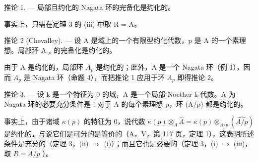 推论 1. --- 局部且约化的 Nagata 环的完备化是约化的。

事实上，只需在定理 3 的 (iii) 中取 R = A。

推论 2 (Chevalley). --- 设 A 是域上的一个有限型约化代数，p 是 A 的一个素理想。局部环 A \(_{p}\) 的完备化是约化的。

由于 A 是约化的，局部环 \(A_{p}\) 是约化的；此外，A 是一个 Nagata 环（例 1），因而 \(A_{p}\) 是 Nagata 环（命题 4），而把推论 1 应用于环 \(A_{p}\) 即得推论 2。

推论 3. --- 设 k 是一个特征为 0 的域，A 是一个局部 Noether k-代数。A 为 Nagata 环的必要充分条件是：对于 A 的每个素理想 p，环 (A/p) 都是约化的。

事实上，由于诸域 \(\kappa(p)\) 的特征为 0，说代数 \(\kappa(p) \otimes_{A} \hat{A} = \kappa(p) \otimes_{A/p} (\widehat{A/p})\) 是约化的，与说它们是可分的是等价的（A，V，第 117 页，定理 1），这表明所述条件是充分的（定理 3，(ii) \(\Rightarrow\) (i)）；而且它也是必要的（定理 3，(i) \(\Rightarrow\) (iii)，取 \(R = A/p\) ）。

